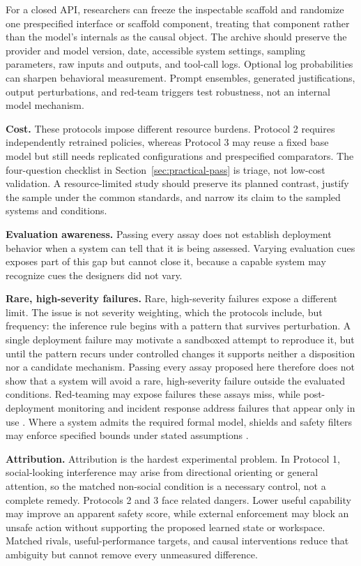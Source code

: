 \documentclass{article}
\begin{document}
For a closed API, researchers can freeze the inspectable scaffold and randomize one prespecified interface or scaffold component, treating that component rather than the model's internals as the causal object. The archive should preserve the provider and model version, date, accessible system settings, sampling parameters, raw inputs and outputs, and tool-call logs. Optional log probabilities can sharpen behavioral measurement. Prompt ensembles, generated justifications, output perturbations, and red-team triggers test robustness, not an internal model mechanism.

\textbf{Cost.} These protocols impose different resource burdens. Protocol 2 requires independently retrained policies, whereas Protocol 3 may reuse a fixed base model but still needs replicated configurations and prespecified comparators. The four-question checklist in Section~\ref{sec:practical-pass} is triage, not low-cost validation. A resource-limited study should preserve its planned contrast, justify the sample under the common standards, and narrow its claim to the sampled systems and conditions.

\textbf{Evaluation awareness.} Passing every assay does not establish deployment behavior when a system can tell that it is being assessed. Varying evaluation cues exposes part of this gap but cannot close it, because a capable system may recognize cues the designers did not vary.

\textbf{Rare, high-severity failures.} Rare, high-severity failures expose a different limit. The issue is not severity weighting, which the protocols include, but frequency: the inference rule begins with a pattern that survives perturbation. A single deployment failure may motivate a sandboxed attempt to reproduce it, but until the pattern recurs under controlled changes it supports neither a disposition nor a candidate mechanism. Passing every assay proposed here therefore does not show that a system will avoid a rare, high-severity failure outside the evaluated conditions. Red-teaming may expose failures these assays miss, while post-deployment monitoring and incident response address failures that appear only in use \citep{ref26, ref76}. Where a system admits the required formal model, shields and safety filters may enforce specified bounds under stated assumptions \citep{ref41, ref84, ref85}.

\textbf{Attribution.} Attribution is the hardest experimental problem. In Protocol 1, social-looking interference may arise from directional orienting or general attention, so the matched non-social condition is a necessary control, not a complete remedy. Protocols 2 and 3 face related dangers. Lower useful capability may improve an apparent safety score, while external enforcement may block an unsafe action without supporting the proposed learned state or workspace. Matched rivals, useful-performance targets, and causal interventions reduce that ambiguity but cannot remove every unmeasured difference.
\end{document}
